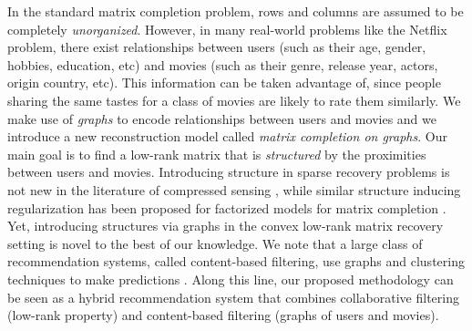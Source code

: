\documentclass{article}
\begin{document}
In the standard matrix completion problem, rows and columns are assumed to be completely {\it unorganized}. However, in many real-world problems like the Netflix problem, there exist relationships between users (such as their age, gender, hobbies, education, etc) and movies (such as their genre, release year, actors, origin country, etc). This information can be taken advantage of, since people sharing the same tastes for a class of movies are likely to rate them similarly. We make use of {\it graphs} to encode relationships between users and movies and we introduce a new reconstruction model called {\it matrix completion on graphs}. Our main goal is to find a low-rank matrix that is {\it structured} by the proximities between users and movies. 
%
Introducing structure in sparse recovery problems is not new in the literature of compressed sensing  \cite{pro:HuangZhangMetaxas09StrucSpars,art:BaraniukCevherDuarteHegde10SparStru, art:JenattonAudibertBach11SparStru}, while similar structure inducing regularization has been proposed for factorized models for matrix completion \cite{ma2011recommender}. Yet, introducing structures via graphs in the convex low-rank matrix recovery setting is novel to the best of our knowledge. 
%
We note that a large class of recommendation systems, called content-based filtering, use graphs and clustering techniques to make predictions \cite{huang2002graph}. Along this line, our proposed methodology can be seen as a hybrid recommendation system that combines collaborative filtering (low-rank property) and content-based filtering (graphs of users and movies).  
\end{document}
